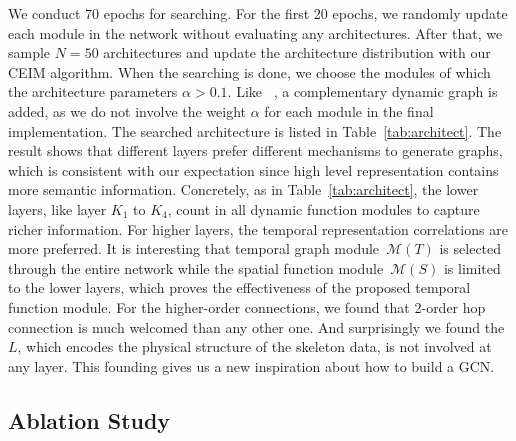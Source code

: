 \documentclass[letterpaper]{article} \usepackage{aaai19}  \usepackage{times}  \usepackage{helvet} \usepackage{courier}  \usepackage[hyphens]{url}  \usepackage{graphicx} \urlstyle{rm} \def\UrlFont{\rm}  \usepackage{graphicx}  \frenchspacing  \setlength{\pdfpagewidth}{8.5in}  \setlength{\pdfpageheight}{11in}
\begin{document}
We conduct 70 epochs for searching. For the first 20 epochs, we randomly update each module in the network without evaluating any architectures. After that,  we sample $N=50$ architectures and update the architecture distribution with our CEIM algorithm. When the searching is done, we choose the modules of which the architecture parameters $\alpha > 0.1$. Like ~\cite{shi2019two}, a complementary dynamic graph is added, as we do not involve the weight $\alpha$ for each module in the final implementation. The searched architecture is listed in Table~\ref{tab:architect}. The result shows that different layers prefer different mechanisms to generate graphs, which is consistent with our expectation since high level representation contains more semantic information. Concretely, as in Table~\ref{tab:architect}, the lower layers, like layer $K_1$ to $K_4$, count in all dynamic function modules to capture richer information. For higher layers, the temporal representation correlations are more preferred. It is interesting that temporal graph module~$\mathcal{M}(T)$ is selected through the entire network while the spatial function module~$\mathcal{M}(S)$ is limited to the lower layers, which proves the effectiveness of the proposed temporal function module. For the higher-order connections, we found that 2-order hop connection is much welcomed than any other one. And surprisingly we found the $L$, which encodes the physical structure of the skeleton data, is not involved at any layer. This founding gives us a new inspiration about how to build a GCN.

\subsection{Ablation Study}
\end{document}

